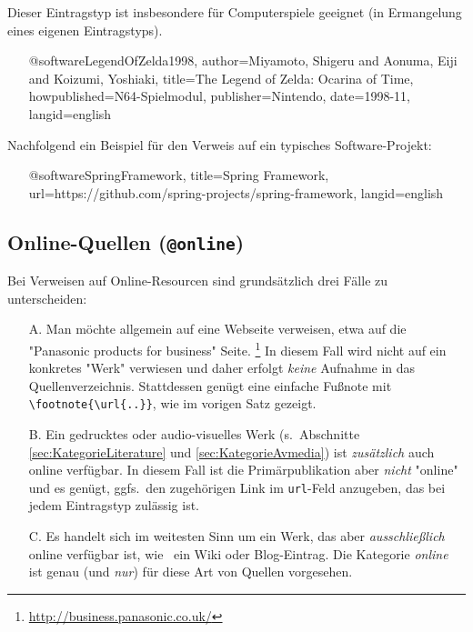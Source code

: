 Dieser Eintragstyp ist insbesondere für Computerspiele geeignet (in
Ermangelung eines eigenen Eintragstyps).
%
\begin{itemize}
\item[]
\begin{GenericCode}[numbers=none]
@software{LegendOfZelda1998,
  author={Miyamoto, Shigeru and Aonuma, Eiji and Koizumi, Yoshiaki},
  title={The Legend of Zelda: Ocarina of Time},
  howpublished={N64-Spielmodul},
  publisher={Nintendo},
  date={1998-11},
  langid={english}
}
\end{GenericCode}
\item[\cite{LegendOfZelda1998}] 
\end{itemize}

\noindent
Nachfolgend ein Beispiel für den Verweis auf ein typisches Software-Projekt:
%
\begin{itemize}
\item[]
\begin{GenericCode}[numbers=none]
@software{SpringFramework,
  title={Spring Framework},
  url={https://github.com/spring-projects/spring-framework},
  langid={english}
}
\end{GenericCode}
\item[\cite{SpringFramework}] 
\end{itemize}



\subsection{Online-Quellen (\texttt{\bfseries @online})}
\label{sec:KategorieOnline}

Bei Verweisen auf Online-Resourcen sind grundsätzlich drei Fälle zu
unterscheiden:
%
\begin{itemize}
    \item[A.] Man möchte allgemein auf eine Webseite verweisen, etwa auf die
    "Panasonic products for business" Seite.%
    \footnote{\url{http://business.panasonic.co.uk/}}
    In diesem Fall wird nicht auf ein konkretes "Werk" verwiesen und daher
    erfolgt \emph{keine} Aufnahme in das Quellenverzeichnis. Stattdessen genügt
    eine einfache Fußnote mit \verb!\footnote{\url{..}}!, wie im vorigen Satz
    gezeigt.
%
    \item[B.] Ein gedrucktes oder audio-visuelles Werk (s.\ Abschnitte
    \ref{sec:KategorieLiterature} und \ref{sec:KategorieAvmedia}) ist
    \emph{zusätzlich} auch online verfügbar. In diesem Fall ist die
    Primär\-publikation aber \emph{nicht} "online" und es genügt, ggfs.\ den
    zugehörigen Link im \texttt{url}-Feld anzugeben, das bei jedem Eintragstyp
    zulässig ist.
%
    \item[C.] Es handelt sich im weitesten Sinn um ein Werk, das aber
    \emph{ausschließlich} online verfügbar ist, wie \zB\ ein Wiki oder
    Blog-Eintrag. Die Kategorie \emph{online} ist genau (und \emph{nur}) für
    diese Art von Quellen vorgesehen.
\end{itemize}


